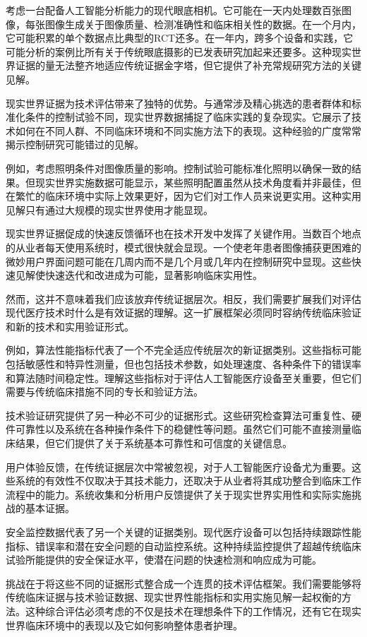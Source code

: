 \documentclass[
  Letterpaper,
]{scrbook}
\begin{document}
考虑一台配备人工智能分析能力的现代眼底相机。它可能在一天内处理数百张图像，每张图像生成关于图像质量、检测准确性和临床相关性的数据。在一个月内，它可能积累的单个数据点比典型的RCT还多。在一年内，跨多个设备和实践，它可能分析的案例比所有关于传统眼底摄影的已发表研究加起来还要多。这种现实世界证据的量无法整齐地适应传统证据金字塔，但它提供了补充常规研究方法的关键见解。

现实世界证据为技术评估带来了独特的优势。与通常涉及精心挑选的患者群体和标准化条件的控制试验不同，现实世界数据捕捉了临床实践的复杂现实。它展示了技术如何在不同人群、不同临床环境和不同实施方法下的表现。这种经验的广度常常揭示控制研究可能错过的见解。

例如，考虑照明条件对图像质量的影响。控制试验可能标准化照明以确保一致的结果。但现实世界实施数据可能显示，某些照明配置虽然从技术角度看并非最佳，但在繁忙的临床环境中实际上效果更好，因为它们对工作人员来说更实用。这种实用见解只有通过大规模的现实世界使用才能显现。

现实世界证据促成的快速反馈循环也在技术开发中发挥了关键作用。当数百个地点的从业者每天使用系统时，模式很快就会显现。一个使老年患者图像捕获更困难的微妙用户界面问题可能在几周内而不是几个月或几年内在控制研究中显现。这些快速见解使快速迭代和改进成为可能，显著影响临床实用性。

然而，这并不意味着我们应该放弃传统证据层次。相反，我们需要扩展我们对评估现代医疗技术时什么是有效证据的理解。这一扩展框架必须同时容纳传统临床验证和新的技术和实用验证形式。

例如，算法性能指标代表了一个不完全适应传统层次的新证据类别。这些指标可能包括敏感性和特异性测量，但也包括技术参数，如处理速度、各种条件下的错误率和算法随时间稳定性。理解这些指标对于评估人工智能医疗设备至关重要，但它们需要与传统临床措施不同的专长和验证方法。

技术验证研究提供了另一种必不可少的证据形式。这些研究检查算法可重复性、硬件可靠性以及系统在各种操作条件下的稳健性等问题。虽然它们可能不直接测量临床结果，但它们提供了关于系统基本可靠性和可信度的关键信息。

用户体验反馈，在传统证据层次中常被忽视，对于人工智能医疗设备尤为重要。这些系统的有效性不仅取决于其技术能力，还取决于从业者将其成功整合到临床工作流程中的能力。系统收集和分析用户反馈提供了关于现实世界实用性和实际实施挑战的基本证据。

安全监控数据代表了另一个关键的证据类别。现代医疗设备可以包括持续跟踪性能指标、错误率和潜在安全问题的自动监控系统。这种持续监控提供了超越传统临床试验所能提供的安全保证水平，使潜在问题的快速检测和响应成为可能。

挑战在于将这些不同的证据形式整合成一个连贯的技术评估框架。我们需要能够将传统临床证据与技术验证数据、现实世界性能指标和实用实施见解一起权衡的方法。这种综合评估必须考虑的不仅是技术在理想条件下的工作情况，还有它在现实世界临床环境中的表现以及它如何影响整体患者护理。
\end{document}
